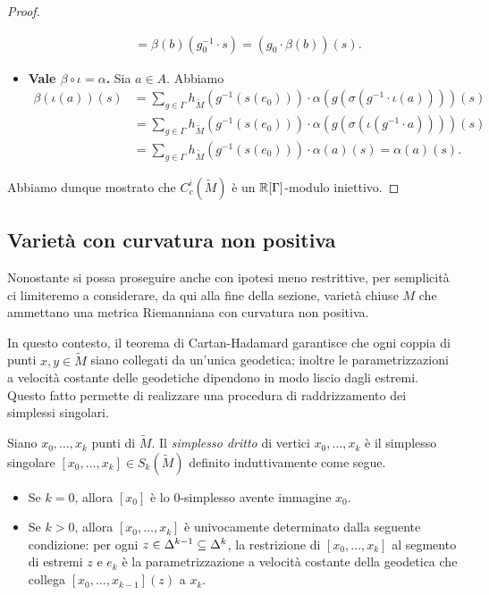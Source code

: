 \begin{proof}
\begin{itemize}
\begin{align*}
&=\beta(b)(g_0^{-1}\cdot s)=(g_0\cdot\beta(b))(s).
\end{align*}
\item \textbf{Vale $\beta\circ\iota=\alpha$.} Sia $a\in A$. Abbiamo
\begin{align*}
\beta(\iota(a))(s)&=\sum_{g\in\Gamma}h_{\widetilde M}(g^{-1}(s(e_0)))\cdot \alpha(g(\sigma(g^{-1}\cdot\iota(a))))(s)\\
&=\sum_{g\in\Gamma}h_{\widetilde M}(g^{-1}(s(e_0)))\cdot \alpha(g(\sigma(\iota(g^{-1}\cdot a))))(s)\\
&=\sum_{g\in\Gamma}h_{\widetilde M}(g^{-1}(s(e_0)))\cdot \alpha(a)(s)=\alpha(a)(s).
\end{align*}
\end{itemize}
Abbiamo dunque mostrato che $C^i_c(\widetilde M)$ è un $\mathbb{R}[\Gamma]$-modulo iniettivo.
\end{proof}

\subsection{Varietà con curvatura non positiva}
Nonostante si possa proseguire anche con ipotesi meno restrittive, per semplicità ci limiteremo a considerare, da qui alla fine della sezione, varietà chiuse $M$ che ammettano una metrica Riemanniana con curvatura non positiva.

In questo contesto, il teorema di Cartan-Hadamard garantisce che ogni coppia di punti $x,y\in\widetilde M$ siano collegati da un'unica geodetica; inoltre le parametrizzazioni a velocità costante delle geodetiche dipendono in modo liscio dagli estremi. Questo fatto permette di realizzare una procedura di raddrizzamento dei simplessi singolari.

\begin{definition}
Siano $x_0,\ldots,x_k$ punti di $\widetilde M$. Il \emph{simplesso dritto} di vertici $x_0,\ldots,x_k$ è il simplesso singolare $[x_0,\ldots,x_k]\in S_k(\widetilde M)$ definito induttivamente come segue.
\begin{itemize}
\item Se $k=0$, allora $[x_0]$ è lo $0$-simplesso avente immagine $x_0$.
\item Se $k>0$, allora $[x_0,\ldots,x_k]$ è univocamente determinato dalla seguente condizione: per ogni $z\in\Delta^{k-1}\subseteq\Delta^k$, la restrizione di $[x_0,\ldots,x_k]$ al segmento di estremi $z$ e $e_k$ è la parametrizzazione a velocità costante della geodetica che collega $[x_0,\ldots,x_{k-1}](z)$ a $x_k$.
\end{itemize}
\end{definition}

